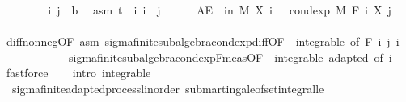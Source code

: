 \begin{isabellebody}
\ \ \isacommand{{\isacharbraceleft}{\kern0pt}}\isamarkupfalse%
\isanewline
\ \ \ \ \isamarkupfalse%
\ i\ j\ {\isacharcolon}{\kern0pt}{\isacharcolon}{\kern0pt}\ {\isacharprime}{\kern0pt}b\ \isamarkupfalse%
\ asm{\isacharcolon}{\kern0pt}\ {\isachardoublequoteopen}t\ {\isasymle}\ i{\isachardoublequoteclose}\ {\isachardoublequoteopen}i\ {\isasymle}\ j{\isachardoublequoteclose}\isanewline
\ \ \ \ \isamarkupfalse%
\ {\isachardoublequoteopen}AE\ {\isasymxi}\ in\ M{\isachardot}{\kern0pt}\ X\ i\ {\isasymxi}\ {\isasymle}\ cond{\isacharunderscore}{\kern0pt}exp\ M\ {\isacharparenleft}{\kern0pt}F\ i{\isacharparenright}{\kern0pt}\ {\isacharparenleft}{\kern0pt}X\ j{\isacharparenright}{\kern0pt}\ {\isasymxi}{\isachardoublequoteclose}\ \isanewline
\ \ \ \ \ \ \isamarkupfalse%
\ diff{\isacharunderscore}{\kern0pt}nonneg{\isacharbrackleft}{\kern0pt}OF\ asm{\isacharbrackright}{\kern0pt}\ sigma{\isacharunderscore}{\kern0pt}finite{\isacharunderscore}{\kern0pt}subalgebra{\isachardot}{\kern0pt}cond{\isacharunderscore}{\kern0pt}exp{\isacharunderscore}{\kern0pt}diff{\isacharbrackleft}{\kern0pt}OF\ {\isacharunderscore}{\kern0pt}\ integrable{\isacharparenleft}{\kern0pt}{}{\isacharcomma}{\kern0pt}{}{\isacharparenright}{\kern0pt}{\isacharcomma}{\kern0pt}\ of\ {\isachardoublequoteopen}F\ i{\isachardoublequoteclose}\ j\ i{\isacharbrackright}{\kern0pt}\isanewline
\ \ \ \ \ \ \ \ \ \ \ \ sigma{\isacharunderscore}{\kern0pt}finite{\isacharunderscore}{\kern0pt}subalgebra{\isachardot}{\kern0pt}cond{\isacharunderscore}{\kern0pt}exp{\isacharunderscore}{\kern0pt}F{\isacharunderscore}{\kern0pt}meas{\isacharbrackleft}{\kern0pt}OF\ {\isacharunderscore}{\kern0pt}\ integrable\ adapted{\isacharcomma}{\kern0pt}\ of\ i{\isacharbrackright}{\kern0pt}\ \isamarkupfalse%
\ fastforce\isanewline
\ \ \isacommand{{\isacharbraceright}{\kern0pt}}\isamarkupfalse%
\isanewline
{}\isamarkupfalse%
\ {\isacharparenleft}{\kern0pt}intro\ integrable{\isacharparenright}{\kern0pt}%
\endisatagproof
{\isafoldproof}%
%
\isadelimproof
\isanewline
%
\endisadelimproof
\isanewline
{}\isamarkupfalse%
\ {\isacharparenleft}{\kern0pt}\ sigma{\isacharunderscore}{\kern0pt}finite{\isacharunderscore}{\kern0pt}adapted{\isacharunderscore}{\kern0pt}process{\isacharunderscore}{\kern0pt}linorder{\isacharparenright}{\kern0pt}\ submartingale{\isacharunderscore}{\kern0pt}of{\isacharunderscore}{\kern0pt}set{\isacharunderscore}{\kern0pt}integral{\isacharunderscore}{\kern0pt}le{\isacharcolon}{\kern0pt}\isanewline

\end{isabellebody}
